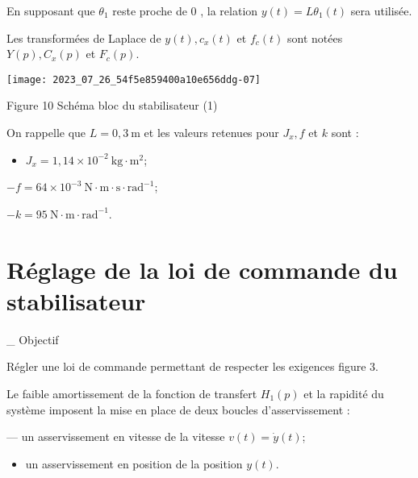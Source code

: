 En supposant que $\theta_{1}$ reste proche de 0 , la relation $y(t)=L \theta_{1}(t)$ sera utilisée.

Les transformées de Laplace de $y(t), c_{x}(t)$ et $f_{c}(t)$ sont notées $Y(p), C_{x}(p)$ et $F_{c}(p)$.


\begin{center}
\texttt{[image: 2023\_07\_26\_54f5e859400a10e656ddg-07]}
\end{center}

Figure 10 Schéma bloc du stabilisateur (1)

On rappelle que $L=0,3 \mathrm{~m}$ et les valeurs retenues pour $J_{x}, f$ et $k$ sont :

\begin{itemize}
  \item $J_{x}=1,14 \times 10^{-2} \mathrm{~kg} \cdot \mathrm{m}^{2}$;
\end{itemize}

$-f=64 \times 10^{-3} \mathrm{~N} \cdot \mathrm{m} \cdot \mathrm{s} \cdot \mathrm{rad}^{-1}$;

$-k=95 \mathrm{~N} \cdot \mathrm{m} \cdot \mathrm{rad}^{-1}$.


\section{Réglage de la loi de commande du stabilisateur}
\_ Objectif

Régler une loi de commande permettant de respecter les exigences figure 3.

Le faible amortissement de la fonction de transfert $H_{1}(p)$ et la rapidité du système imposent la mise en place de deux boucles d'asservissement :

— un asservissement en vitesse de la vitesse $v(t)=\dot{y}(t)$;

\begin{itemize}
  \item un asservissement en position de la position $y(t)$.
\end{itemize}

